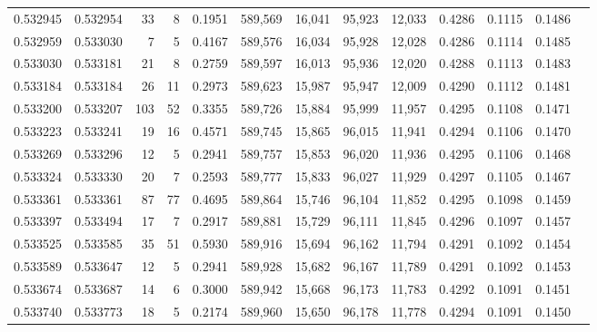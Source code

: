 \begin{tabular}{rrrrrrrrrrrrr}
0.532945 & 0.532954 &    33 &     8 &                                     0.1951 & 589,569 &  16,041 &  95,923 &  12,033 & 0.4286 & 0.1115 & 0.1486 \\
0.532959 & 0.533030 &     7 &     5 &                                     0.4167 & 589,576 &  16,034 &  95,928 &  12,028 & 0.4286 & 0.1114 & 0.1485 \\
0.533030 & 0.533181 &    21 &     8 &                                     0.2759 & 589,597 &  16,013 &  95,936 &  12,020 & 0.4288 & 0.1113 & 0.1483 \\
0.533184 & 0.533184 &    26 &    11 &                                     0.2973 & 589,623 &  15,987 &  95,947 &  12,009 & 0.4290 & 0.1112 & 0.1481 \\
0.533200 & 0.533207 &   103 &    52 &                                     0.3355 & 589,726 &  15,884 &  95,999 &  11,957 & 0.4295 & 0.1108 & 0.1471 \\
0.533223 & 0.533241 &    19 &    16 &                                     0.4571 & 589,745 &  15,865 &  96,015 &  11,941 & 0.4294 & 0.1106 & 0.1470 \\
0.533269 & 0.533296 &    12 &     5 &                                     0.2941 & 589,757 &  15,853 &  96,020 &  11,936 & 0.4295 & 0.1106 & 0.1468 \\
0.533324 & 0.533330 &    20 &     7 &                                     0.2593 & 589,777 &  15,833 &  96,027 &  11,929 & 0.4297 & 0.1105 & 0.1467 \\
0.533361 & 0.533361 &    87 &    77 &                                     0.4695 & 589,864 &  15,746 &  96,104 &  11,852 & 0.4295 & 0.1098 & 0.1459 \\
0.533397 & 0.533494 &    17 &     7 &                                     0.2917 & 589,881 &  15,729 &  96,111 &  11,845 & 0.4296 & 0.1097 & 0.1457 \\
0.533525 & 0.533585 &    35 &    51 &                                     0.5930 & 589,916 &  15,694 &  96,162 &  11,794 & 0.4291 & 0.1092 & 0.1454 \\
0.533589 & 0.533647 &    12 &     5 &                                     0.2941 & 589,928 &  15,682 &  96,167 &  11,789 & 0.4291 & 0.1092 & 0.1453 \\
0.533674 & 0.533687 &    14 &     6 &                                     0.3000 & 589,942 &  15,668 &  96,173 &  11,783 & 0.4292 & 0.1091 & 0.1451 \\
0.533740 & 0.533773 &    18 &     5 &                                     0.2174 & 589,960 &  15,650 &  96,178 &  11,778 & 0.4294 & 0.1091 & 0.1450 \\

\end{tabular}
